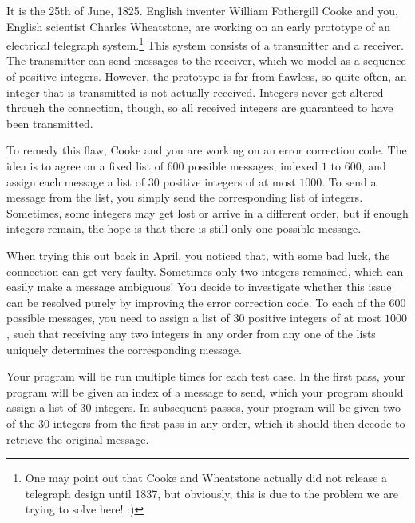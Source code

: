 

\newcommand{\maxx}{1000}
\newcommand{\maxl}{30}
\newcommand{\maxk}{600}

It is the 25th of June, 1825.
English inventer William Fothergill Cooke and you, English scientist Charles Wheatstone, are working on an early prototype of an electrical telegraph system.\footnote{
    One may point out that Cooke and Wheatstone actually did not release a telegraph design until 1837,
    but obviously, this is due to the problem we are trying to solve here! :)
}
This system consists of a transmitter and a receiver.
The transmitter can send messages to the receiver, which we model as a sequence of positive integers.
However, the prototype is far from flawless, so quite often, an integer that is transmitted is not actually received.
Integers never get altered through the connection, though, so all received integers are guaranteed to have been transmitted.

To remedy this flaw, Cooke and you are working on an error correction code.
The idea is to agree on a fixed list of $\maxk$ possible messages, indexed $1$ to $\maxk$, and assign each message a list of $\maxl$ positive integers of at most $\maxx$.
To send a message from the list, you simply send the corresponding list of integers.
Sometimes, some integers may get lost or arrive in a different order,
but if enough integers remain, the hope is that there is still only one possible message.

When trying this out back in April, you noticed that, with some bad luck, the connection can get very faulty.
Sometimes only two integers remained, which can easily make a message ambiguous!
You decide to investigate whether this issue can be resolved purely by improving the error correction code.
To each of the $\maxk$ possible messages, you need to assign a list of $\maxl$ positive integers of at most $\maxx$,
such that receiving any two integers in any order from any one of the lists uniquely determines the corresponding message.

Your program will be run multiple times for each test case.
In the first pass, your program will be given an index of a message to send, which your program should assign a list of $\maxl$ integers.
In subsequent passes, your program will be given two of the $\maxl$ integers from the first pass in any order,
which it should then decode to retrieve the original message.

